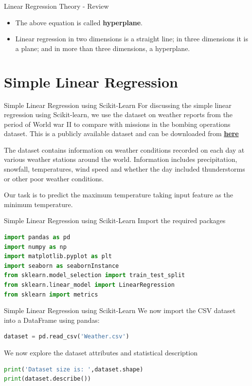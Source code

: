 \documentclass[12pt,xcolor={dvipsnames}]{beamer}
\begin{document}
\begin{frame}{Linear Regression Theory - Review}
\begin{itemize}
  \item The above equation is called \textbf{hyperplane}.
  \item Linear regression in two dimensions is a straight line; in three dimensions it is a plane; and in more than three dimensions, a hyperplane.
\end{itemize}
\end{frame}

\section{Simple Linear Regression}

\begin{frame}{Simple Linear Regression using Scikit-Learn}
For discussing the simple linear regression using Scikit-learn, we use the dataset on weather reports from the period of World war II to compare
with missions in the bombing operations dataset. This is a publicly available dataset and can be downloaded from \href{https://drive.google.com/open?id=1fiHg5DyvQeRC4SyhsVnje5dhJNyVWpO1}{\textbf{here}}\\\bigskip

The dataset contains information on weather conditions recorded on each day at various weather stations around the world. Information includes precipitation, snowfall, temperatures, wind speed and whether the day included thunderstorms or other poor weather conditions.\\\bigskip

Our task is to predict the maximum temperature taking input feature as the minimum temperature.
\end{frame}

\begin{frame}[fragile]{Simple Linear Regression using Scikit-Learn}
Import the required packages
\begin{lstlisting}[language=Python]
import pandas as pd
import numpy as np
import matplotlib.pyplot as plt
import seaborn as seabornInstance
from sklearn.model_selection import train_test_split
from sklearn.linear_model import LinearRegression
from sklearn import metrics
\end{lstlisting}
\end{frame}

\begin{frame}[fragile]{Simple Linear Regression using Scikit-Learn}
We now import the CSV dataset into a DataFrame using pandas:
\begin{lstlisting}[language=Python]
dataset = pd.read_csv('Weather.csv')
\end{lstlisting}
We now explore the dataset attributes and statistical description
\begin{lstlisting}[language=Python]
print('Dataset size is: ',dataset.shape)
print(dataset.describe())
\end{lstlisting}
\end{frame}
\end{document}
